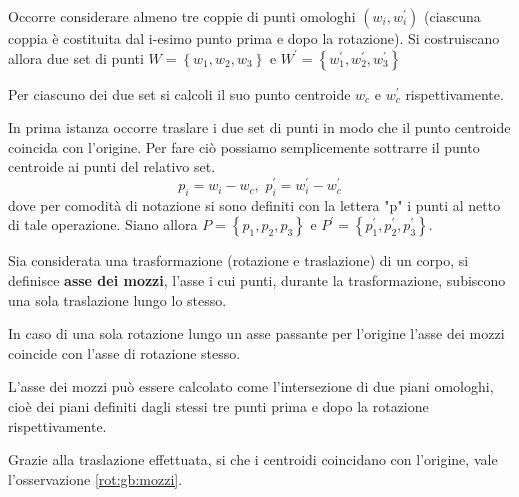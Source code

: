 Occorre considerare almeno tre coppie di punti omologhi $(w_i, w_i^{'})$ (ciascuna coppia è costituita dal i-esimo punto prima e dopo la rotazione). Si costruiscano allora due set di punti $W = \left\lbrace w_1, w_2, w_3 \right\rbrace$ e $W^{'} = \left\lbrace w_1^{'}, w_2^{'}, w_3^{'} \right\rbrace$

Per ciascuno dei due set si calcoli il suo punto centroide $w_c$ e $w_c^{'}$ rispettivamente.

In prima istanza occorre traslare i due set di punti in modo che il punto centroide coincida con l'origine. Per fare ciò possiamo semplicemente sottrarre il punto centroide ai punti del relativo set.
\begin{equation}
p_i = w_i - w_c, \, \, 
p_i^{'} = w_i^{'} - w_c^{'}
\end{equation}
dove per comodità di notazione si sono definiti con la lettera "p" i punti al netto di tale operazione. Siano allora $P = \left\lbrace p_1, p_2, p_3 \right\rbrace$ e $P^{'} = \left\lbrace p_1^{'}, p_2^{'}, p_3^{'} \right\rbrace$.

\begin{defn}
	Sia considerata una trasformazione (rotazione e traslazione) di un corpo, si definisce \textbf{asse dei mozzi}, l'asse i cui punti, durante la trasformazione, subiscono una sola traslazione lungo lo stesso. 
\end{defn}

\begin{obs}
	\label{rot:gb:mozzi}
	In caso di una sola rotazione lungo un asse passante per l'origine l'asse dei mozzi coincide con l'asse di rotazione stesso.
	
	L'asse dei mozzi può essere calcolato come l'intersezione di due piani omologhi, cioè dei piani definiti dagli stessi tre punti prima e dopo la rotazione rispettivamente.
\end{obs}

Grazie alla traslazione effettuata, si che i centroidi coincidano con l'origine, vale l'osservazione \ref{rot:gb:mozzi}.

